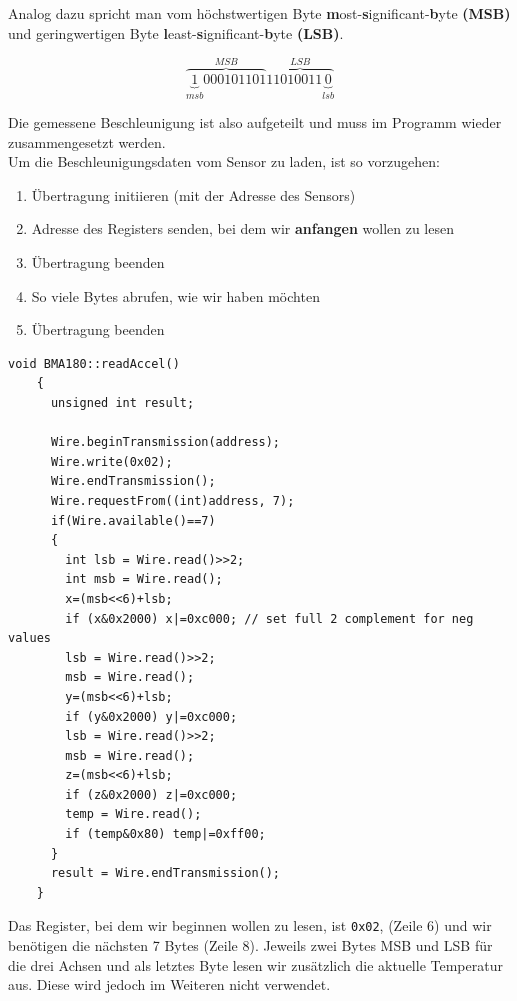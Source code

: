 \documentclass[12pt,a4paper]{scrartcl}
\begin{document}
Analog dazu spricht man vom höchstwertigen Byte \textbf{m}ost-\textbf{s}ignificant-\textbf{b}yte \textbf{(MSB)} und geringwertigen Byte \textbf{l}east-\textbf{s}ignificant-\textbf{b}yte \textbf{(LSB)}.

\begin{equation}
\overbrace {\underbrace{1}_{msb}000101101}^{MSB}\overbrace {11010011\underbrace{0}_{lsb}}^{LSB}
\end{equation}

Die gemessene Beschleunigung ist also aufgeteilt und muss im Programm wieder zusammengesetzt werden. \\

Um die Beschleunigungsdaten vom Sensor zu laden, ist so vorzugehen:
\begin{enumerate}
	\item Übertragung initiieren (mit der Adresse des Sensors)
	\item Adresse des Registers senden, bei dem wir \textbf{anfangen} wollen zu lesen
	\item Übertragung beenden
	\item So viele Bytes abrufen, wie wir haben möchten
	\item Übertragung beenden
\end{enumerate}

\begin{lstlisting}[frame=trBL]
	void BMA180::readAccel()
	{
	  unsigned int result;

	  Wire.beginTransmission(address);
	  Wire.write(0x02);
	  Wire.endTransmission();
	  Wire.requestFrom((int)address, 7);
	  if(Wire.available()==7)
	  {
	    int lsb = Wire.read()>>2;
	    int msb = Wire.read();
	    x=(msb<<6)+lsb; 
	    if (x&0x2000) x|=0xc000; // set full 2 complement for neg values
	    lsb = Wire.read()>>2;
	    msb = Wire.read();
	    y=(msb<<6)+lsb;
	    if (y&0x2000) y|=0xc000;
	    lsb = Wire.read()>>2;
	    msb = Wire.read();
	    z=(msb<<6)+lsb;
	    if (z&0x2000) z|=0xc000;
	    temp = Wire.read();
	    if (temp&0x80) temp|=0xff00;
	  }
	  result = Wire.endTransmission();
	}
\end{lstlisting}

Das Register, bei dem wir beginnen wollen zu lesen, ist \texttt{0x02}, (Zeile 6) und wir benötigen die nächsten 7 Bytes (Zeile 8). Jeweils zwei Bytes MSB und LSB für die drei Achsen und als letztes Byte lesen wir zusätzlich die aktuelle Temperatur aus. Diese wird jedoch im Weiteren nicht verwendet.\\
\end{document}
